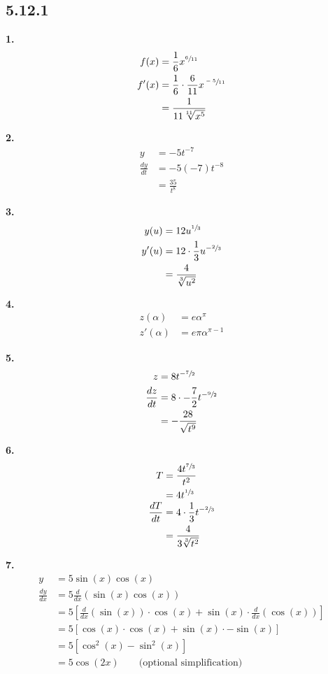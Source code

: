 \documentclass[10pt,oneside,]{book}
\theoremstyle{plain}
\theoremstyle{definition}
\numberwithin{equation}{section}
\newcommand{\fe}[2]{#1\mathopen{}\left(#2\right)\mathclose{}}
\newcommand{\fd}[1]{#1'}
\newcommand{\lz}[2]{\frac{d#1}{d#2}}
\newcommand{\lzoo}[2]{{\frac{d}{d#1}}{\left(#2\right)}}
\begin{document}
\subsection*{5.12.1 }
\noindent\textbf{1.}\quad{}\begin{align*}
\fe{f}{x}&=\frac{1}{6}x^{\sfrac{6}{11}}\\
\fe{\fd{f}}{x}&=\frac{1}{6}\cdot\frac{6}{11}x^{\sfrac{-5}{11}}\\
&=\frac{1}{11\sqrt[11]{x^{5}}}
\end{align*}%
\par\smallskip
\noindent\textbf{2.}\quad{}\begin{align*}
y&=-5t^{-7}\\
\lz{y}{t}&=-5(-7)t^{-8}\\
&=\frac{35}{t^8}
\end{align*}%
\par\smallskip
\noindent\textbf{3.}\quad{}\begin{align*}
\fe{y}{u}&=12u^{\sfrac{1}{3}}\\
\fe{\fd{y}}{u}&=12\cdot\frac{1}{3}u^{-\sfrac{2}{3}}\\
&=\frac{4}{\sqrt[3]{u^2}}
\end{align*}%
\par\smallskip
\noindent\textbf{4.}\quad{}\begin{align*}
\fe{z}{\alpha}&=e\alpha^{\pi}\\
\fe{\fd{z}}{\alpha}&=e\pi\alpha^{\pi-1}
\end{align*}%
\par\smallskip
\noindent\textbf{5.}\quad{}\begin{align*}
z&=8t^{-\sfrac{7}{2}}\\
\lz{z}{t}&=8\cdot-\frac{7}{2}t^{-\sfrac{9}{2}}\\
&=-\frac{28}{\sqrt{t^{9}}}
\end{align*}%
\par\smallskip
\noindent\textbf{6.}\quad{}\begin{align*}
T&=\frac{4t^{\sfrac{7}{3}}}{t^2}\\
&=4t^{\sfrac{1}{3}}\\
\lz{T}{t}&=4\cdot\frac{1}{3}t^{-\sfrac{2}{3}}\\
&=\frac{4}{3\sqrt[3]{t^{2}}}
\end{align*}%
\par\smallskip
\noindent\textbf{7.}\quad{}\begin{align*}
y&=5\fe{\sin}{x}\fe{\cos}{x}\\
\lz{y}{x}&=5\lzoo{x}{\fe{\sin}{x}\fe{\cos}{x}}\\
&=5\left[\lzoo{x}{\fe{\sin}{x}}\cdot\fe{\cos}{x}+\fe{\sin}{x}\cdot\lzoo{x}{\fe{\cos}{x}}\right]\\
&=5\left[\fe{\cos}{x}\cdot\fe{\cos}{x}+\fe{\sin}{x}\cdot-\fe{\sin}{x}\right]\\
&=5\left[\fe{\cos^2}{x}-\fe{\sin^2}{x}\right]\\
&=5\fe{\cos}{2x}\qquad\text{(optional simplification)}
\end{align*}%
\end{document}
